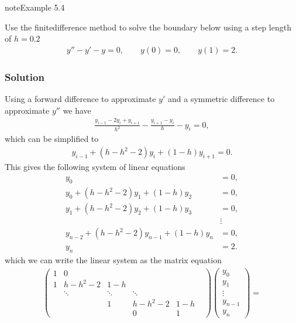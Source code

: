 \documentclass[letterpaper,10pt,english]{jupyterBook}
\begin{document}
\begin{sphinxadmonition}{note}{Example 5.4}

\sphinxAtStartPar
Use the finite\sphinxhyphen{}difference method to solve the boundary below using a step length of \(h = 0.2\)
\begin{align*}
    y'' - y' - y = 0, \qquad y(0) = 0, \qquad y(1) = 2.
\end{align*}\subsubsection*{Solution}

\sphinxAtStartPar
Using a forward difference to approximate \(y'\) and a symmetric difference to approximate \(y''\) we have
\begin{align*}
    \frac{y_{i-1} -2y_i +y_{i+1} }{h^2 }-\frac{y_{i+1} -y_i }{h}-y_i = 0,
\end{align*}
\sphinxAtStartPar
which can be simplified to
\begin{align*}
    y_{i-1} +(h-h^2 -2)y_i +(1-h)y_{i+1} = 0.
\end{align*}
\sphinxAtStartPar
This gives the following system of linear equations
\begin{align*}
    y_0 &= 0, \\
    y_0 + (h - h^2 - 2) y_1 + (1 - h) y_2 &= 0, \\
    y_1 + (h - h^2 - 2) y_2 + (1 - h) y_3 &= 0, \\
    &\vdots \\
    y_{n-2} + (h - h^2 - 2) y_{n-1} + (1 - h) y_n &= 0, \\
    y_n &= 2.
\end{align*}
\sphinxAtStartPar
which we can write the linear system as the matrix equation
\begin{align*}
    \begin{pmatrix}
        1 & 0 & &  &  & \\
        1 & h-h^2 -2 & 1-h &  &  & \\
        &  \ddots  & \ddots  & \ddots  & \\
        &  & 1 & h-h^2 -2 & 1-h \\
        &  &  & 0 & 1
    \end{pmatrix} 
    \begin{pmatrix} y_0 \\ y_1 \\ \vdots \\ y_{n-1} \\ y_n \end{pmatrix}  =

\end{align*}
\end{sphinxadmonition}
\end{document}
